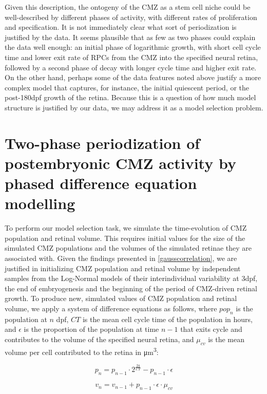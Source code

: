 \documentclass{ut-thesis}
\begin{document}
\begin{NoHyper}
Given this description, the ontogeny of the CMZ as a stem cell niche could be well-described by different phases of activity, with different rates of proliferation and specification. It is not immediately clear what sort of periodization is justified by the data. It seems plausible that as few as two phases could explain the data well enough: an initial phase of logarithmic growth, with short cell cycle time and lower exit rate of RPCs from the CMZ into the specified neural retina, followed by a second phase of decay with longer cycle time and higher exit rate. On the other hand, perhaps some of the data features noted above justify a more complex model that captures, for instance, the initial quiescent period, or the post-180dpf growth of the retina. Because this is a question of how much model structure is justified by our data, we may address it as a model selection problem.

\section{Two-phase periodization of postembryonic CMZ activity by phased difference equation modelling}
\label{sec:phaseGMC}
To perform our model selection task, we simulate the time-evolution of CMZ population and retinal volume. This requires initial values for the size of the simulated CMZ populations and the volumes of the simulated retinae they are associated with. Given the findings presented in \autoref{gausscorrelation}, we are justified in initializing CMZ population and retinal volume by independent samples from the Log-Normal models of their interindividual variability at 3dpf, the end of embryogenesis and the beginning of the period of CMZ-driven retinal growth. To produce new, simulated values of CMZ population and retinal volume, we apply a system of difference equations as follows, where $pop_n$ is the population at $n$ dpf, $CT$ is the mean cell cycle time of the population in hours, and $\epsilon$ is the proportion of the population at time $n-1$ that exits cycle and contributes to the volume of the specified neural retina, and $\mu_{cv}$ is the mean volume per cell contributed to the retina in \si{\cubic\micro\metre}:

\begin{equation}
    p_n=p_{n-1} \cdot 2^{\frac{24}{CT}} - p_{n-1} \cdot \epsilon
    \label{popeq}
\end{equation}

\begin{equation}
    v_n=v_{n-1} + p_{n-1} \cdot \epsilon \cdot \mu_{cv}
    \label{voleq}
\end{equation}


\end{NoHyper}
\end{document}
